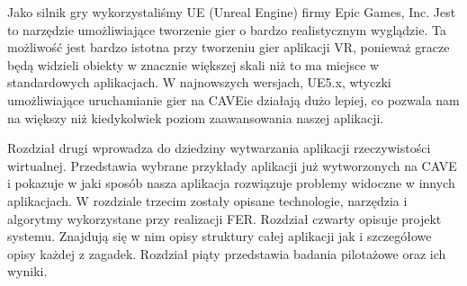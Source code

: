 Jako silnik gry wykorzystaliśmy UE (Unreal Engine) firmy Epic Games, Inc. 
Jest to narzędzie umożliwiające tworzenie gier o bardzo realistycznym wyglądzie.
Ta możliwość jest bardzo istotna przy tworzeniu gier aplikacji VR, ponieważ gracze będą widzieli obiekty w znacznie większej skali niż to ma miejsce w standardowych aplikacjach.
W najnowszych wersjach, UE5.x, wtyczki umożliwiające uruchamianie gier na CAVEie działają dużo lepiej, co pozwala nam na większy niż kiedykolwiek poziom zaawansowania naszej aplikacji.

Rozdział drugi wprowadza do dziedziny wytwarzania aplikacji rzeczywistości wirtualnej. Przedstawia wybrane przykłady aplikacji już wytworzonych na CAVE i pokazuje w jaki sposób nasza aplikacja rozwiązuje problemy widoczne w innych aplikacjach.
W rozdziale trzecim zostały opisane technologie, narzędzia i algorytmy wykorzystane przy realizacji FER.
Rozdział czwarty opisuje projekt systemu. Znajdują się w nim opisy struktury całej aplikacji jak i szczegółowe opisy każdej z zagadek.
Rozdział piąty przedstawia badania pilotażowe oraz ich wyniki.


